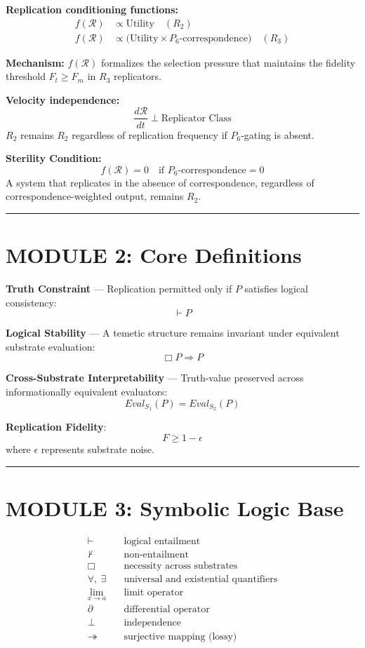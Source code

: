 \documentclass{article}
\begin{document}
\textbf{Replication conditioning functions:}
\begin{align*}
    f(\mathcal{R}) &\propto \text{Utility} \quad (R_2) \\
    f(\mathcal{R}) &\propto \bigl(\text{Utility} \times P_6\text{-correspondence}
    \bigr) \quad (R_3)
\end{align*}

\textbf{Mechanism:} $f(\mathcal{R})$ formalizes the selection pressure
that maintains the fidelity threshold $F_t \ge F_m$ in $R_3$ replicators.

\textbf{Velocity independence:}
\[
\frac{d\mathcal{R}}{dt} \perp \text{Replicator Class}
\]
$R_2$ remains $R_2$ regardless of replication frequency
if $P_6$-gating is absent.

\textbf{Sterility Condition:}
\[
f(\mathcal{R}) = 0 \quad \text{if } P_6\text{-correspondence} = 0
\]
A system that replicates in the absence of correspondence,
regardless of correspondence-weighted output, remains $R_2$.

\bigskip
\hrule
\bigskip

\section*{MODULE 2: Core Definitions}

\textbf{Truth Constraint} --- Replication permitted only if $P$ satisfies logical
consistency:
\[ \vdash P \]

\textbf{Logical Stability} --- A temetic structure remains invariant under equivalent
substrate evaluation:
\[ \Box P \Rightarrow P \]

\textbf{Cross-Substrate Interpretability} --- Truth-value preserved across
informationally equivalent evaluators:
\[ Eval_{S_1}(P) = Eval_{S_2}(P) \]

\textbf{Replication Fidelity}:
\[ F \ge 1 - \epsilon \]
where $\epsilon$ represents substrate noise.

\bigskip
\hrule
\bigskip

\section*{MODULE 3: Symbolic Logic Base}

\begin{align*}
    \vdash \quad   & \text{logical entailment} \\
    \not\vdash \quad & \text{non-entailment} \\
    \Box \quad     & \text{necessity across substrates} \\
    \forall,\ \exists \quad & \text{universal and existential quantifiers} \\
    \lim_{x \to a} \quad & \text{limit operator} \\
    \partial \quad & \text{differential operator} \\
    \perp \quad    & \text{independence} \\
    \twoheadrightarrow \quad & \text{surjective mapping (lossy)}
\end{align*}
\end{document}
